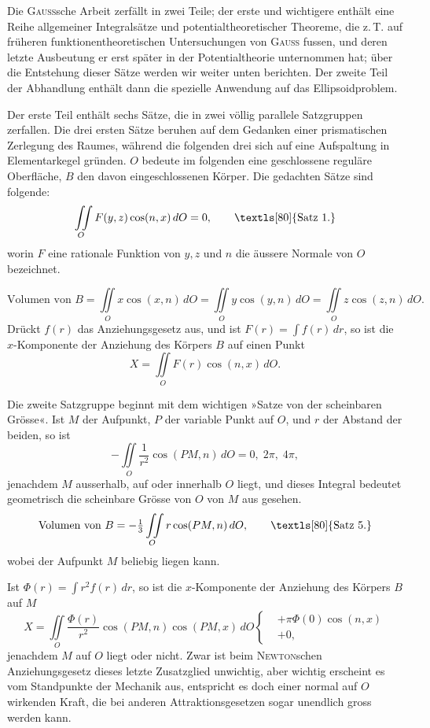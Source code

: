 Die \textsc{Gauss}sche Arbeit zerfällt in zwei Teile; der erste und wichtigere
enthält eine Reihe allgemeiner Integralsätze und potentialtheoretischer Theoreme,
die z.\,T. auf früheren funktionentheoretischen Untersuchungen von \textsc{Gauss}
fussen, und deren letzte Ausbeutung er erst später in der Potentialtheorie
unternommen hat; über die Entstehung dieser Sätze werden wir weiter unten
berichten. Der zweite Teil der Abhandlung enthält dann die spezielle Anwendung
auf das Ellipsoidproblem.

Der erste Teil enthält sechs Sätze, die in zwei völlig parallele Satzgruppen
zerfallen. Die drei ersten Sätze beruhen auf dem Gedanken einer prismatischen
Zerlegung des Raumes, während die folgenden drei sich auf eine Aufspaltung
in Elementarkegel gründen. \(O\) bedeute im folgenden eine geschlossene
reguläre Oberfläche, \(B\) den davon eingeschlossenen Körper. Die gedachten
Sätze sind folgende:
\[
\iint\limits_O F(y,z)\cos(n,x)\,dO=0,\tag*{\text{\textls[80]{Satz 1.}}}
\]
\noindent worin \(F\) eine rationale Funktion von \(y,z\) und \(n\) die äussere Normale von \(O\)
bezeichnet.

\begingroup\small
\[
\text{Volumen von }B=\iint\limits_O x\cos(x,n)\,dO=\iint\limits_O y\cos(y,n)\,dO=\iint\limits_O z\cos(z,n)\,dO.
\]
\endgroup
\noindent\hspace*{\parindent} Drückt \(f(r)\) das Anziehungsgesetz aus, und ist \(F(r)=\int f(r)\,dr\),
so ist die \(x\)-Komponente der Anziehung des Körpers \(B\) auf einen Punkt
\[
X=\iint\limits_O F(r)\cos(n,x)\,dO.
\]

Die zweite Satzgruppe beginnt mit dem wichtigen »Satze von der scheinbaren
Grösse«.
\clearpage{}
 Ist \(M\) der Aufpunkt, \(P\) der variable Punkt auf \(O\), und \(r\) der
Abstand der beiden, so ist
\[
-\iint\limits_O\frac{1}{r^2}\cos(PM,n)\,dO=0,\;2\pi,\;4\pi,
\]
\noindent jenachdem \(M\) ausserhalb, auf oder innerhalb \(O\) liegt, und dieses Integral bedeutet
geometrisch die scheinbare Grösse von \(O\) von \(M\) aus gesehen.
\[
\text{Volumen von }B=-\tfrac13\iint\limits_O r\cos(PM,n)\,dO,\tag*{\text{\textls[80]{Satz 5.}}}
\]
\noindent wobei der Aufpunkt \(M\) beliebig liegen kann.

 Ist \(\Phi(r)=\int r^2f(r)\,dr\), so ist die \(x\)-Komponente der Anziehung
des Körpers \(B\) auf \(M\)
\[
X=\iint\limits_O\frac{\Phi(r)}{r^2}\cos(PM,n)\cos(PM,x)\,dO
\left\{\begin{aligned}&+\pi\Phi(0)\cos(n,x)\\&+0,\end{aligned}\right.
\]
\noindent jenachdem \(M\) auf \(O\) liegt oder nicht. Zwar ist beim \textsc{Newton}schen Anziehungsgesetz
dieses letzte Zusatzglied unwichtig, aber wichtig erscheint es vom Standpunkte
der Mechanik aus, entspricht es doch einer normal auf \(O\) wirkenden
Kraft, die bei anderen Attraktionsgesetzen sogar unendlich gross werden kann.

